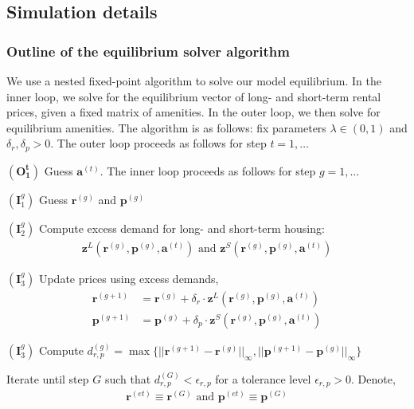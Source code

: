 \documentclass[11pt]{article}
\begin{document}
\subsection{Simulation details}\label{sec:appendix counterfactuals}

\subsubsection{Outline of the equilibrium solver algorithm}\label{sec: equilibrium_solver}
We use a nested fixed-point algorithm to solve our model equilibrium. In the inner loop, we solve for the equilibrium vector of long- and short-term rental prices, given a fixed matrix of amenities. In the outer loop, we then solve for equilibrium amenities. The algorithm is as follows: fix parameters $\lambda \in (0,1)$ and $\delta_r, \delta_p > 0$. The outer loop proceeds as follows for step $t=1,\dots$

\noindent $\mathbf{(O_1^t)}$ Guess $\mathbf{a}^{(t)}$. The inner loop proceeds as follows for step $g=1,\dots$

$(\mathbf{I}_1^g)$ Guess $\mathbf{r}^{(g)}$ and $\mathbf{p}^{(g)}$

$(\mathbf{I}_2^g)$ Compute excess demand for long- and short-term housing:
\begin{align*}
\mathbf{z}^L(\mathbf{r}^{(g)},\mathbf{p}^{(g)},\mathbf{a}^{(t)}) \text{ and }  \mathbf{z}^S(\mathbf{r}^{(g)},\mathbf{p}^{(g)},\mathbf{a}^{(t)})
\end{align*}

$(\mathbf{I}_3^g)$ Update prices using excess demands,
\begin{align*}
    \mathbf{r}^{(g+1)} &= \mathbf{r}^{(g)} + \delta_r \cdot  \mathbf{z}^L(\mathbf{r}^{(g)},\mathbf{p}^{(g)},\mathbf{a}^{(t)}) \\
    \mathbf{p}^{(g+1)} &= \mathbf{p}^{(g)} + \delta_p \cdot  \mathbf{z}^S(\mathbf{r}^{(g)},\mathbf{p}^{(g)},\mathbf{a}^{(t)})
\end{align*}

$(\mathbf{I}_3^g)$ Compute $d_{r,p}^{(g)} = \max \Big\{ ||\mathbf{r}^{(g+1)} - \mathbf{r}^{(g)}||_{\infty}, ||\mathbf{p}^{(g+1)} - \mathbf{p}^{(g)}||_{\infty} \Big\}$ 

Iterate until step $G$ such that $d_{r,p}^{(G)} < \epsilon_{r,p}$ for a tolerance level $\epsilon_{r,p} > 0$. Denote,
\begin{align*}
    \mathbf{r}^{(et)} \equiv \mathbf{r}^{(G)} \text{ and } \mathbf{p}^{(et)} \equiv \mathbf{p}^{(G)}
\end{align*}
\end{document}
